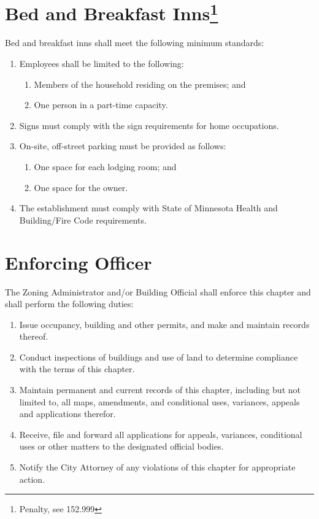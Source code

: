\section{Bed and Breakfast Inns\footnote{Penalty, see 152.999}}
Bed and breakfast inns shall meet the following minimum standards:
\begin{enumerate}[{\indent}A)]
    \item Employees shall be limited to the following:
        \begin{enumerate}
            \item Members of the household residing on the premises; and 
            \item One person in a part-time capacity.
        \end{enumerate}
    \item Signs must comply with the sign requirements for home occupations.
    \item On-site, off-street parking must be provided as follows: 
        \begin{enumerate}
            \item One space for each lodging room; and 
            \item One space for the owner.
        \end{enumerate}
    \item The establishment must comply with State of Minnesota Health and Building/Fire Code requirements.
\end{enumerate}


\setcounter{section}{194}
\section{Enforcing Officer}
The Zoning Administrator and/or Building Official shall enforce this chapter and shall perform the following duties:
\begin{enumerate}[{\indent}A)]
    \item Issue occupancy, building and other permits, and make and maintain records thereof.
    \item Conduct inspections of buildings and use of land to determine compliance with the terms of this chapter.
    \item Maintain permanent and current records of this chapter, including but not limited to, all maps, amendments, and conditional uses, variances, appeals and applications therefor.
    \item Receive, file and forward all applications for appeals, variances, conditional uses or other matters to the designated official bodies.
    \item Notify the City Attorney of any violations of this chapter for appropriate action.
\end{enumerate}

